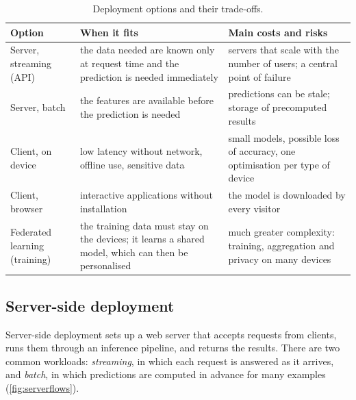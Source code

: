 \begin{table}[htbp]
\centering\small
\caption{Deployment options and their trade-offs.}\label{tab:deploy}
\begin{tabularx}{\textwidth}{@{}>{\raggedright\arraybackslash}p{2.5cm}>{\raggedright\arraybackslash}X>{\raggedright\arraybackslash}X@{}}
\toprule
Option & When it fits & Main costs and risks\\
\midrule
Server, streaming (API) & the data needed are known only at request time and the prediction is
needed immediately & servers that scale with the number of users; a central point of failure\\
Server, batch & the features are available before the prediction is needed & predictions can be
stale; storage of precomputed results\\
Client, on device & low latency without network, offline use, sensitive data & small models,
possible loss of accuracy, one optimisation per type of device\\
Client, browser & interactive applications without installation & the model is downloaded by every
visitor\\
Federated learning (training) & the training data must stay on the devices; it learns a shared model, which
can then be personalised &
much greater complexity: training, aggregation and privacy on many devices\\
\bottomrule
\end{tabularx}
\end{table}

\subsection{Server-side deployment}

Server-side deployment sets up a web server that accepts requests from clients, runs them through an
inference pipeline, and returns the results. There are two common workloads: \emph{streaming}, in
which each request is answered as it arrives, and \emph{batch}, in which predictions are computed in
advance for many examples (\cref{fig:serverflows}).

